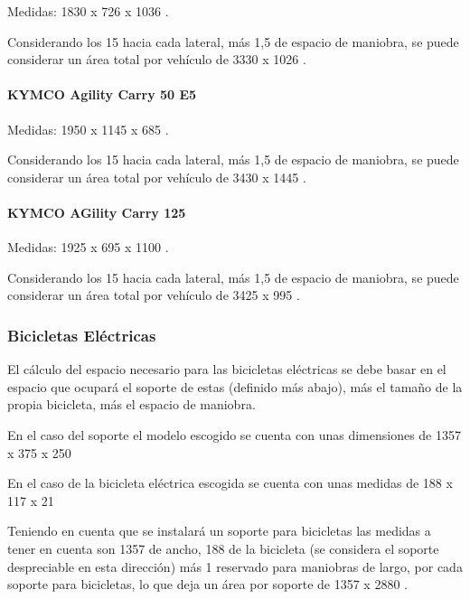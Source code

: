 Medidas: 1830 x 726 x 1036 . \cite{manualmotoe}

Considerando los 15  hacia cada lateral, más 1,5  de espacio de maniobra, se puede considerar un área total por vehículo de 3330 x 1026 .

\paragraph{KYMCO Agility Carry 50 E5}
\label{agilitycarry50}

Medidas: 1950 x 1145 x 685 . \cite{eliotmotor}

Considerando los 15  hacia cada lateral, más 1,5  de espacio de maniobra, se puede considerar un área total por vehículo de 3430 x 1445 .

\paragraph{KYMCO AGility Carry 125}
\label{agilitycarry125}

Medidas: 1925 x 695 x 1100 . \cite{motofichas}

Considerando los 15  hacia cada lateral, más 1,5  de espacio de maniobra, se puede considerar un área total por vehículo de 3425 x 995 .

\subsubsection{Bicicletas Eléctricas}
\label{bicicletaselectricas}

El cálculo del espacio necesario para las bicicletas eléctricas se debe basar en el espacio que ocupará el soporte de estas (definido más abajo), más el tamaño de la propia bicicleta, más el espacio de maniobra.

En el caso del soporte el modelo escogido se cuenta con unas dimensiones de \cite{aparcapatinetes} 1357 x 375 x 250 

En el caso de la bicicleta eléctrica escogida se cuenta con unas medidas de \cite{emoonmedidas}  188 x 117 x 21 

Teniendo en cuenta que se instalará un soporte para bicicletas las medidas a tener en cuenta son 1357  de ancho, 188  de la bicicleta (se considera el soporte despreciable en esta dirección) más 1  reservado para maniobras de largo, por cada soporte para bicicletas, lo que deja un área por soporte de 1357 x 2880 .


